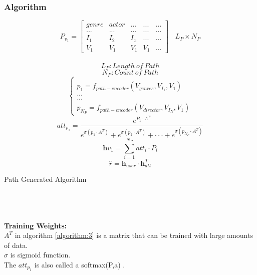 \subsubsection{Algorithm}

\begin{algorithm}[H]
\SetAlgoLined
\KwResult{ \[ P_{v_{1}} \] \[ \hat{r} \] }

\[
P_{v_{1}} = \begin{bmatrix}
 genre & actor  & ... & ... & ... \\ 
 ... & ...  & ... & ... & ... \\ 
 I_{1}& I_{2} & I_{x} & ... & ... \\ 
 V_{1} & V_{1}  & V_{1}  & V_{1} & ...
\end{bmatrix}
\ \ \ \ L_{P}\times N_{P}
\]
\\
\[
L_{P} : Length \ of \ Path
\]
\[
N_{P} : Count \ of \ Path
\]
\[
\left\{\begin{matrix}
\\ p_{1} = f_{path-encoder} (V_{genres},V_{I_{1}},V_{1})
\\ ...
\\ ...
\\ p_{N_{P}} = f_{path-encoder} (V_{director},V_{I_{N}},V_{1})

\end{matrix}\right.
\]
\[
att_{p_{1}} = \frac{e^{P_{1} \cdot A^{T}}}{e^{\sigma(p_{1}\cdot A^{T})}  +  e^{\sigma(p_{2}\cdot A^{T})}  + \cdot \cdot \cdot +e^{\sigma(p_{N_{P}}\cdot A^{T})}}
\]
\[
\textbf{h}v_{1} =  \sum_{i=1}^{N_{P}} att_{i}\cdot P_{i}
\]
\[
\hat{r} = \textbf{h}_{user}\cdot \textbf{h}_{att}^{T}
\]
 
\caption{Path Generated Algorithm}
\label{algorithm:3}
\end{algorithm}

\textbf{ \ \ }\\
\textbf{ \ \ }\\
\textbf{ \ \ }\\
\textbf{Training Weights:}\\
$ A^{T} $ in algorithm \ref{algorithm:3} is a matrix that can be trained with large amounts of data. \\
$ \sigma $ is sigmoid function.\\
The $ att_{p_{1}} $ is also called a softmax(P,a) \cite{wu2016deep}.

